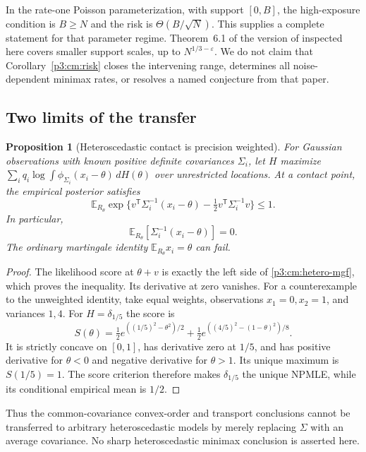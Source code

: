 \documentclass[11pt,a4paper]{article}
\newtheorem{proposition}[theorem]{Proposition}
\theoremstyle{definition}
\theoremstyle{remark}
\numberwithin{equation}{section}
\begin{document}
In the rate-one Poisson parameterization, with support $[0,B]$, the
high-exposure condition is $B\ge N$ and the risk is
$\Theta(B/\sqrt N)$.  This supplies a complete statement for that
parameter regime.  Theorem~6.1 of the version of
\cite{p8:PC_Miao2021} inspected here covers smaller support scales, up to
$N^{1/3-\varepsilon}$.  We do not claim that
Corollary~\ref{p3:cm:risk} closes the intervening range, determines all
noise-dependent minimax rates, or resolves a named conjecture from that
paper.

\subsection{Two limits of the transfer}

\begin{proposition}[Heteroscedastic contact is precision weighted]
\label{p3:cm:hetero}
For Gaussian observations with known positive definite covariances
$\Sigma_i$, let $H$ maximize
$\sum_iq_i\log\int\phi_{\Sigma_i}(x_i-\theta)\,dH(\theta)$ over
unrestricted locations.  At a contact point, the empirical posterior
satisfies
\begin{equation}\label{p3:cm:hetero-mgf}
 \mathbb E_{R_\theta}
 \exp\{v^{\mathsf T}\Sigma_i^{-1}(x_i-\theta)
                   -\tfrac12v^{\mathsf T}\Sigma_i^{-1}v\}\le1.
\end{equation}
In particular,
\[
 \mathbb E_{R_\theta}[\Sigma_i^{-1}(x_i-\theta)]=0.
\]
The ordinary martingale identity
$\mathbb E_{R_\theta}x_i=\theta$ can fail.
\end{proposition}

\begin{proof}
The likelihood score at $\theta+v$ is exactly the left side of
\eqref{p3:cm:hetero-mgf}, which proves the inequality.  Its derivative at
zero vanishes.  For a counterexample to the unweighted identity, take
equal weights, observations $x_1=0,x_2=1$, and variances $1,4$.
For $H=\delta_{1/5}$ the score is
\[
 S(\theta)=\tfrac12e^{((1/5)^2-\theta^2)/2}
       +\tfrac12e^{((4/5)^2-(1-\theta)^2)/8}.
\]
It is strictly concave on $[0,1]$, has derivative zero at $1/5$,
and has positive derivative for $\theta<0$ and negative derivative
for $\theta>1$.  Its unique maximum is $S(1/5)=1$.
The score criterion therefore makes $\delta_{1/5}$ the unique NPMLE,
while its conditional empirical mean is $1/2$.
\end{proof}

Thus the common-covariance convex-order and transport conclusions
cannot be transferred to arbitrary heteroscedastic models by merely
replacing $\Sigma$ with an average covariance.  No sharp
heteroscedastic minimax conclusion is asserted here.
\end{document}
